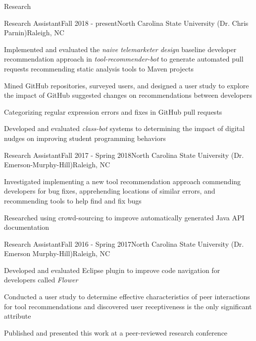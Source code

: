 \documentclass{resume} %
\begin{document}
\begin{rSection}{Research}


\begin{rSubsection}{Research Assistant}{Fall 2018 - present}{North Carolina State University (Dr. Chris Parnin)}{Raleigh, NC}
\item Implemented and evaluated the \textit{naive telemarketer design} baseline developer recommendation approach in \textsl{tool-recommender-bot} to generate automated pull requests recommending static analysis tools to Maven projects 
\item Mined GitHub repositories, surveyed users, and designed a user study to explore the impact of GitHub suggested changes on recommendations between developers
\item Categorizing regular expression errors and fixes in GitHub pull requests
\item Developed and evaluated \textsl{class-bot} systems to determining the impact of digital nudges on improving student programming behaviors 
\end{rSubsection}
\vspace{-5pt}

\begin{rSubsection}{Research Assistant}{Fall 2017 - Spring 2018}{North Carolina State University (Dr. Emerson-Murphy-Hill)}{Raleigh, NC}
\item Investigated implementing a new tool recommendation approach commending developers for bug fixes, apprehending locations of similar errors, and recommending tools to help find and fix bugs
\item Researched using crowd-sourcing to improve automatically generated Java API documentation
\end{rSubsection}
\vspace{-5pt}

\begin{rSubsection}{Research Assistant}{Fall 2016 - Spring 2017}{North Carolina State University (Dr. Emerson Murphy-Hill)}{Raleigh, NC}
\item Developed and evaluated Eclipse plugin to improve code navigation for developers called \textit{Flower}
\item Conducted a user study to determine effective characteristics of peer interactions for tool recommendations and discovered user receptiveness is the only significant attribute
\item Published and presented this work at a peer-reviewed research conference
\end{rSubsection}
\vspace{-5pt}


\end{rSection}
\end{document}
